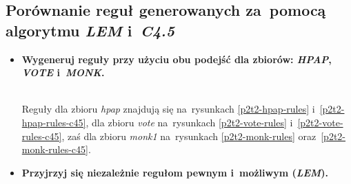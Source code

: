 \subsection{Porównanie reguł generowanych za~pomocą algorytmu \emph{LEM} i~\emph{C4.5}}

\begin{itemize}
\item \textbf{Wygeneruj reguły przy użyciu obu podejść dla zbiorów: \emph{HPAP}, \emph{VOTE} i~\emph{MONK}.}

	
	
	
	
	
	
	\\Reguły dla zbioru \emph{hpap} znajdują się na~rysunkach \ref{p2t2-hpap-rules} i~\ref{p2t2-hpap-rules-c45}, dla zbioru \emph{vote} na~rysunkach \ref{p2t2-vote-rules} i~\ref{p2t2-vote-rules-c45}, zaś dla zbioru \emph{monk1} na~rysunkach \ref{p2t2-monk-rules} oraz~\ref{p2t2-monk-rules-c45}.

\item \textbf{Przyjrzyj się niezależnie regułom pewnym i~możliwym (\emph{LEM}).}
\end{itemize}

